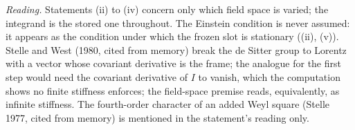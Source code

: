 \emph{Reading.} Statements (ii) to (iv) concern only which field space is varied; the integrand is the stored one throughout. The Einstein condition is never assumed: it appears as the condition under which the frozen slot is stationary ((ii), (v)). Stelle and West (1980, cited from memory) break the de Sitter group to Lorentz with a vector whose covariant derivative is the frame; the analogue for the first step would need the covariant derivative of $I$ to vanish, which the computation shows no finite stiffness enforces; the field-space premise reads, equivalently, as infinite stiffness. The fourth-order character of an added Weyl square (Stelle 1977, cited from memory) is mentioned in the statement's reading only.
